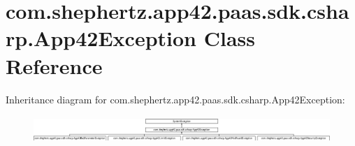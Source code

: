\hypertarget{classcom_1_1shephertz_1_1app42_1_1paas_1_1sdk_1_1csharp_1_1_app42_exception}{\section{com.\+shephertz.\+app42.\+paas.\+sdk.\+csharp.\+App42\+Exception Class Reference}
\label{classcom_1_1shephertz_1_1app42_1_1paas_1_1sdk_1_1csharp_1_1_app42_exception}
}
Inheritance diagram for com.\+shephertz.\+app42.\+paas.\+sdk.\+csharp.\+App42\+Exception\+:\begin{figure}[H]
\begin{center}
\leavevmode
\includegraphics[height=1.014493cm]{classcom_1_1shephertz_1_1app42_1_1paas_1_1sdk_1_1csharp_1_1_app42_exception}
\end{center}
\end{figure}

